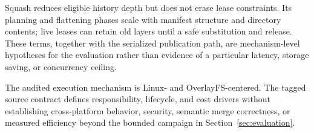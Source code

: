 Squash reduces eligible history depth but does not erase lease constraints.
Its planning and flattening phases scale with manifest structure and directory
contents; live leases can retain old layers until a safe substitution and
release.  These terms, together with the serialized publication path, are
mechanism-level hypotheses for the evaluation rather than evidence of a
particular latency, storage saving, or concurrency ceiling.

The audited execution mechanism is Linux- and OverlayFS-centered. The tagged
source contract defines responsibility, lifecycle, and cost drivers without
establishing cross-platform behavior, security, semantic merge correctness, or
measured efficiency beyond the bounded campaign in Section~\ref{sec:evaluation}.
